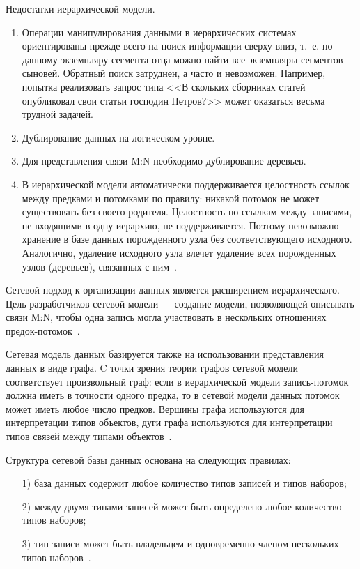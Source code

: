 \documentclass{bmstu}
\begin{document}
Недостатки иерархической модели.

\begin{enumerate}
\item Операции манипулирования данными в иерархических системах ориентированы прежде всего на поиск информации сверху вниз, т.~е. по данному экземпляру сегмента-отца можно найти все экземпляры сегментов-сыновей. 
Обратный поиск затруднен, а часто и невозможен. 
Например, попытка реализовать запрос типа <<В скольких сборниках статей опубликовал свои статьи господин Петров?>> может оказаться весьма трудной задачей.
\item Дублирование данных на логическом уровне.
\item Для представления связи M:N необходимо дублирование деревьев.
\item В иерархической модели автоматически поддерживается целостность ссылок между предками и потомками по правилу: никакой потомок не может существовать без своего родителя. 
Целостность по ссылкам между записями, не входящими в одну иерархию, не поддерживается. 
Поэтому невозможно хранение в базе данных порожденного узла без соответствующего исходного. 
Аналогично, удаление исходного узла влечет удаление всех порожденных узлов (деревьев), связанных с ним~\cite{Avrunev2018}.
\end{enumerate}

Сетевой подход к организации данных является расширением
иерархического. 
Цель разработчиков сетевой модели --- создание модели, позволяющей описывать связи M:N, чтобы одна запись могла участвовать в нескольких отношениях предок-потомок~\cite{Avrunev2018}.

Сетевая модель данных базируется также на использовании представления данных в виде графа. 
C точки зрения теории графов сетевой модели соответствует произвольный граф: если в иерархической модели запись-потомок должна иметь в точности одного предка, то в сетевой модели данных потомок может иметь любое число предков. 
Вершины графа используются для интерпретации типов объектов, дуги графа используются для интерпретации типов связей между типами объектов~\cite{Avrunev2018}.

Структура сетевой базы данных основана на следующих правилах:

\begin{enumerate}
\item[1)] база данных содержит любое количество типов записей и типов наборов;
\item[2)] между двумя типами записей может быть определено любое количество типов наборов;
\item[3)] тип записи может быть владельцем и одновременно членом нескольких типов наборов~\cite{Avrunev2018}.
\end{enumerate}
\end{document}
